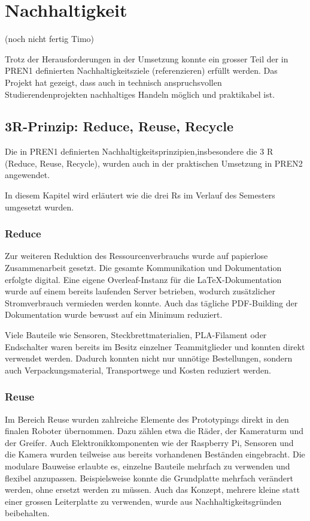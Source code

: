 \section{Nachhaltigkeit}
(noch nicht fertig Timo)

Trotz der Herausforderungen in der Umsetzung konnte ein grosser Teil der in PREN1  definierten Nachhaltigkeitsziele (referenzieren) erfüllt werden. Das Projekt hat gezeigt, dass auch in technisch anspruchsvollen Studierendenprojekten nachhaltiges Handeln möglich und praktikabel ist.

\subsection{3R-Prinzip: Reduce, Reuse, Recycle}
Die in PREN1 definierten Nachhaltigkeitsprinzipien,insbesondere die 3 R (Reduce, Reuse, Recycle), wurden auch in der praktischen Umsetzung in PREN2 angewendet.  

 In diesem Kapitel wird erläutert wie die drei Rs im Verlauf des Semesters umgesetzt wurden.

\subsubsection{Reduce}


Zur weiteren Reduktion des Ressourcenverbrauchs wurde auf papierlose Zusammenarbeit gesetzt. Die gesamte Kommunikation und Dokumentation erfolgte digital. Eine eigene Overleaf-Instanz für die LaTeX-Dokumentation wurde auf einem bereits laufenden Server betrieben, wodurch zusätzlicher Stromverbrauch vermieden werden konnte. Auch das tägliche PDF-Building der Dokumentation wurde bewusst auf ein Minimum reduziert.

Viele Bauteile wie Sensoren, Steckbrettmaterialien, PLA-Filament oder Endschalter waren bereits im Besitz einzelner Teammitglieder und konnten direkt verwendet werden. Dadurch konnten nicht nur unnötige Bestellungen, sondern auch Verpackungsmaterial, Transportwege und Kosten reduziert werden.


\subsubsection{Reuse}

Im Bereich Reuse wurden zahlreiche Elemente des Prototypings direkt in den finalen Roboter übernommen. Dazu zählen etwa die Räder, der Kameraturm und der Greifer. Auch Elektronikkomponenten wie der Raspberry Pi, Sensoren und die Kamera wurden teilweise aus bereits vorhandenen Beständen eingebracht. Die modulare Bauweise erlaubte es, einzelne Bauteile mehrfach zu verwenden und flexibel anzupassen. Beispielsweise konnte die Grundplatte mehrfach verändert werden, ohne ersetzt werden zu müssen. Auch das Konzept, mehrere kleine statt einer grossen Leiterplatte zu verwenden, wurde aus Nachhaltigkeitsgründen beibehalten.



